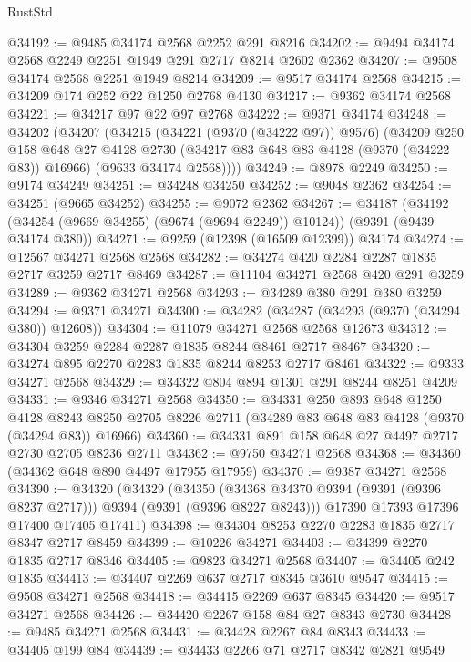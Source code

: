 \begin{lexlean}{RustStd}
\begin{coremodule}
@34192 := @9485 @34174 @2568 @2252 @291 @8216
@34202 := @9494 @34174 @2568 @2249 @2251 @1949 @291 @2717 @8214 @2602 @2362
@34207 := @9508 @34174 @2568 @2251 @1949 @8214
@34209 := @9517 @34174 @2568
@34215 := @34209 @174 @252 @22 @1250 @2768 @4130
@34217 := @9362 @34174 @2568
@34221 := @34217 @97 @22 @97 @2768
@34222 := @9371 @34174
@34248 := @34202
    (@34207
      (@34215
        (@34221 (@9370 (@34222 @97)) @9576)
        (@34209
          @250
          @158
          @648
          @27
          @4128
          @2730
          (@34217 @83 @648 @83 @4128 (@9370 (@34222 @83)) @16966)
          (@9633 @34174 @2568))))
@34249 := @8978 @2249
@34250 := @9174 @34249
@34251 := @34248 @34250
@34252 := @9048 @2362
@34254 := @34251 (@9665 @34252)
@34255 := @9072 @2362
@34267 := @34187
    (@34192 (@34254 (@9669 @34255) (@9674 (@9694 @2249)) @10124))
    (@9391 (@9439 @34174 @380))
@34271 := @9259 (@12398 (@16509 @12399)) @34174
@34274 := @12567 @34271 @2568 @2568
@34282 := @34274 @420 @2284 @2287 @1835 @2717 @3259 @2717 @8469
@34287 := @11104 @34271 @2568 @420 @291 @3259
@34289 := @9362 @34271 @2568
@34293 := @34289 @380 @291 @380 @3259
@34294 := @9371 @34271
@34300 := @34282 (@34287 (@34293 (@9370 (@34294 @380)) @12608))
@34304 := @11079 @34271 @2568 @2568 @12673
@34312 := @34304 @3259 @2284 @2287 @1835 @8244 @8461 @2717 @8467
@34320 := @34274 @895 @2270 @2283 @1835 @8244 @8253 @2717 @8461
@34322 := @9333 @34271 @2568
@34329 := @34322 @804 @894 @1301 @291 @8244 @8251 @4209
@34331 := @9346 @34271 @2568
@34350 := @34331
    @250
    @893
    @648
    @1250
    @4128
    @8243
    @8250
    @2705
    @8226
    @2711
    (@34289 @83 @648 @83 @4128 (@9370 (@34294 @83)) @16966)
@34360 := @34331 @891 @158 @648 @27 @4497 @2717 @2730 @2705 @8236 @2711
@34362 := @9750 @34271 @2568
@34368 := @34360 (@34362 @648 @890 @4497 @17955 @17959)
@34370 := @9387 @34271 @2568
@34390 := @34320
    (@34329
      (@34350 (@34368 @34370 @9394 (@9391 (@9396 @8237 @2717))) @9394 (@9391 (@9396 @8227 @8243)))
      @17390
      @17393
      @17396
      @17400
      @17405
      @17411)
@34398 := @34304 @8253 @2270 @2283 @1835 @2717 @8347 @2717 @8459
@34399 := @10226 @34271
@34403 := @34399 @2270 @1835 @2717 @8346
@34405 := @9823 @34271 @2568
@34407 := @34405 @242 @1835
@34413 := @34407 @2269 @637 @2717 @8345 @3610 @9547
@34415 := @9508 @34271 @2568
@34418 := @34415 @2269 @637 @8345
@34420 := @9517 @34271 @2568
@34426 := @34420 @2267 @158 @84 @27 @8343 @2730
@34428 := @9485 @34271 @2568
@34431 := @34428 @2267 @84 @8343
@34433 := @34405 @199 @84
@34439 := @34433 @2266 @71 @2717 @8342 @2821 @9549

\end{coremodule}
\end{lexlean}

